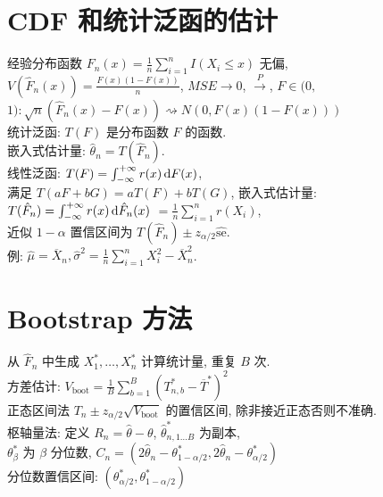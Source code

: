 \documentclass[titlepage, a4paper, landscape]{article}
\begin{document}
\begin{multicols}{4}
\section{CDF 和统计泛函的估计}
经验分布函数 $F_n(x) = \frac{1}{n} \sum_{i = 1}^n I(X_i \leq x)$
无偏,\\ $V(\hat F_n(x)) = \frac{F(x)(1 - F(x))}{n}$, $MSE \rightarrow 0$, $\xrightarrow{P}$,
$F \in (0,$ $1): \sqrt{n} (\hat F_n(x) - F(x)) \rightsquigarrow N(0, F(x)(1 - F(x)))$\\ 
统计泛函: $T(F)$ 是分布函数 $F$ 的函数. \\
嵌入式估计量: $\hat \theta_n = T(\hat F_n)$. \\
线性泛函: $T(F) = \int_{-\infty}^{+\infty} r(x) \,\mathrm{d} F(x)$, \\
满足 $T(aF + bG) = aT(F) + bT(G)$, 嵌入式估计量: $T(\hat F_n) = \int_{-\infty}^{+\infty} r(x) \,\mathrm{d} \hat F_n(x)$ $= \frac{1}{n} \sum_{i = 1}^n r(X_i)$,\\
近似 $1-\alpha$ 置信区间为 $T(\hat F_n) \pm z_{\alpha/2} \hat {\mathrm{se}}$.\\
例: $\hat \mu = \overline X_n, \hat \sigma^2 = \frac{1}{n} \sum_{i = 1}^n X_i^2 - \overline X_n^2$. \\

\newcolumn
\section{Bootstrap 方法}
从 $\hat F_n$ 中生成 $X_1^*, \dots, X_n^*$ 计算统计量, 重复 $B$ 次. \\
方差估计:  $V_{\mathrm{boot}} = \frac{1}{B} \sum_{b = 1}^B (T_{n,b}^* - \overline T^*)^2$\\
正态区间法 $T_n \pm z_{\alpha/2} \sqrt{V_{\mathrm{boot}}}$ 的置信区间, 除非接近正态否则不准确. \\
枢轴量法: 定义 $R_n = \hat \theta - \theta$, $\hat \theta_{n,1 \dots B }^*$ 为副本, \\
$\theta_\beta^*$ 为 $\beta$ 分位数, $C_n = (2 \hat \theta_n - \theta_{1 -\alpha / 2}^*, 2 \hat \theta_n - \theta_{\alpha / 2}^*)$\\
分位数置信区间: $(\theta_{\alpha/2}^*, \theta_{1 - \alpha/2}^*)$ \\

\end{multicols}
\end{document}
